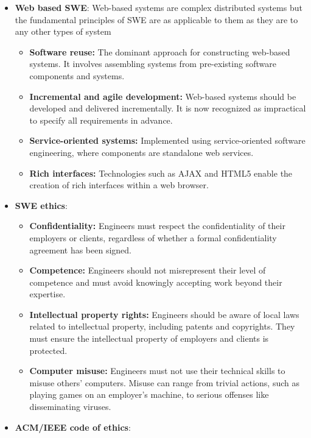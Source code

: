 \documentclass{report}
\begin{document}
\begin{itemize}
        \item \textbf{Web based SWE}: Web-based systems are complex distributed systems but the fundamental principles of SWE are as applicable to them as they are to any other types of system
            \begin{itemize}[noitemsep]
                \item \textbf{Software reuse:} The dominant approach for constructing web-based systems. It involves assembling systems from pre-existing software components and systems.
                \item \textbf{Incremental and agile development:} Web-based systems should be developed and delivered incrementally. It is now recognized as impractical to specify all requirements in advance.
                \item \textbf{Service-oriented systems:} Implemented using service-oriented software engineering, where components are standalone web services.
                \item \textbf{Rich interfaces:} Technologies such as AJAX and HTML5 enable the creation of rich interfaces within a web browser.
            \end{itemize}
        \item \textbf{SWE ethics}:
            \begin{itemize}[noitemsep]
                \item \textbf{Confidentiality:} Engineers must respect the confidentiality of their employers or clients, regardless of whether a formal confidentiality agreement has been signed.
                \item \textbf{Competence:} Engineers should not misrepresent their level of competence and must avoid knowingly accepting work beyond their expertise.
                \item \textbf{Intellectual property rights:} Engineers should be aware of local laws related to intellectual property, including patents and copyrights. They must ensure the intellectual property of employers and clients is protected.
                \item \textbf{Computer misuse:} Engineers must not use their technical skills to misuse others' computers. Misuse can range from trivial actions, such as playing games on an employer's machine, to serious offenses like disseminating viruses.
            \end{itemize}
        \item \textbf{ACM/IEEE code of ethics}:
            \begin{itemize}[noitemsep]

\end{itemize}
\end{itemize}
\end{document}
